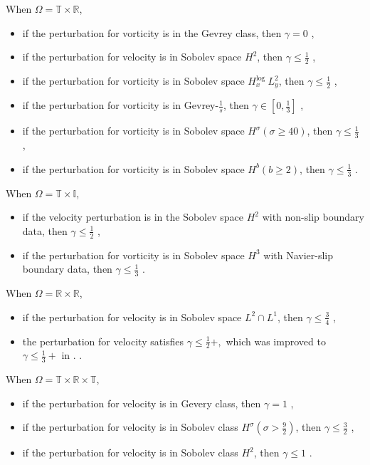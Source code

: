 \documentclass[reqno, 12pt]{amsart} %
\theoremstyle{plain} %
\theoremstyle{definition}
\theoremstyle{remark}
\numberwithin{equation}{section} %
\begin{document}
	When $\Omega=\mathbb{T} \times \mathbb{R}$,
	\begin{itemize}
		\item if the perturbation for vorticity is in the Gevrey class, then $\gamma=0$ \cite{BMV2016},
		\item if the perturbation for velocity is in Sobolev space $H^2$, then $\gamma \leq \frac{1}{2}$ \cite{BWV2018},
		\item if the perturbation for vorticity is in Sobolev space $H_x^{\text {log }} L_y^2$, then $\gamma \leq \frac{1}{2}$ \cite{MZ202002},
		\item if the perturbation for vorticity is in Gevrey-$\frac{1}{s}$, then $\gamma \in\left[0, \frac{1}{3}\right]$ \cite{LMZ2022},
		\item if the perturbation for vorticity is in Sobolev space $H^\sigma (\sigma \geq 40)$, then $\gamma \leq \frac{1}{3}$ \cite{MZ2022},
		\item if the perturbation for vorticity is in Sobolev space $H^b (b \geq 2)$, then $\gamma \leq \frac{1}{3}$ \cite{WZ2023}.
	\end{itemize}
	
	When $\Omega=\mathbb{T} \times \mathbb{I}$,
	\begin{itemize}
		\item if the velocity perturbation is in the Sobolev space $H^2$ with non-slip boundary data, then $\gamma \leq \frac{1}{2}$ \cite{CLWZ2020},
		\item if the perturbation for vorticity is in Sobolev space $H^3$ with Navier-slip boundary data, then $\gamma \leq \frac{1}{3}$ \cite{WZ2024}.
	\end{itemize}
	
	When $\Omega=\mathbb{R} \times \mathbb{R}$,
	\begin{itemize}
		\item if the perturbation for velocity is in Sobolev space $L^2 \cap L^1$, then $\gamma \leq \frac{3}{4}$ \cite{WW2025},
		\item the perturbation for velocity satisfies \cite{AB2024}
      $\gamma \leq \frac{1}{2}+,$
        which was improved  to  $\gamma \leq \frac{1}{3}+$ in 
        \cite{LLZ2025}.
		.
	\end{itemize} 
	
	When $\Omega=\mathbb{T} \times \mathbb{R} \times \mathbb{T}$,
	\begin{itemize}
		\item if the perturbation for velocity is in Gevery class, then $\gamma=1$ \cite{BGM2020,BGM2022},
		\item if the perturbation for velocity is in Sobolev class $H^\sigma\left(\sigma>\frac{9}{2}\right)$, then $\gamma \leq \frac{3}{2}$ \cite{BGM2017},
		\item if the perturbation for velocity is in Sobolev class $H^2$, then $\gamma \leq 1$ \cite{WZ2021}.
	\end{itemize}
	
\end{document}
